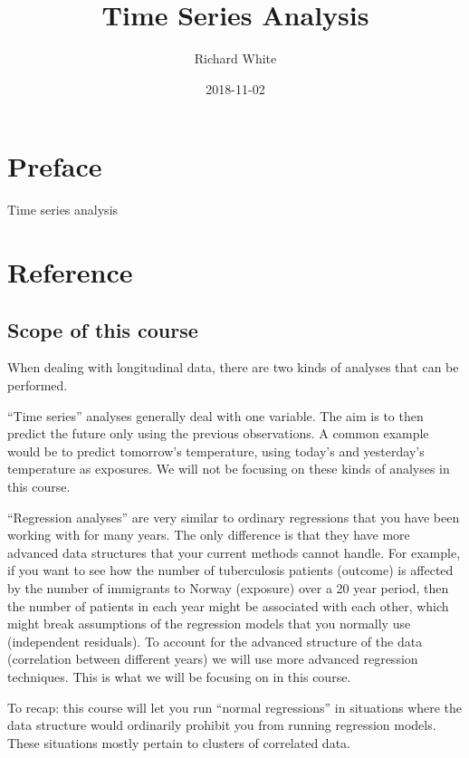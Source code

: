 \documentclass[]{book}
\title{Time Series Analysis}
\author{Richard White}
\date{2018-11-02}
\begin{document}
\maketitle

{
\setcounter{tocdepth}{1}
\tableofcontents
}
\chapter*{Preface}\label{preface}

Time series analysis

\chapter{Reference}\label{reference}

\section{Scope of this course}\label{scope-of-this-course}

When dealing with longitudinal data, there are two kinds of analyses
that can be performed.

``Time series'' analyses generally deal with one variable. The aim is to
then predict the future only using the previous observations. A common
example would be to predict tomorrow's temperature, using today's and
yesterday's temperature as exposures. We will not be focusing on these
kinds of analyses in this course.

``Regression analyses'' are very similar to ordinary regressions that
you have been working with for many years. The only difference is that
they have more advanced data structures that your current methods cannot
handle. For example, if you want to see how the number of tuberculosis
patients (outcome) is affected by the number of immigrants to Norway
(exposure) over a 20 year period, then the number of patients in each
year might be associated with each other, which might break assumptions
of the regression models that you normally use (independent residuals).
To account for the advanced structure of the data (correlation between
different years) we will use more advanced regression techniques. This
is what we will be focusing on in this course.

To recap: this course will let you run ``normal regressions'' in
situations where the data structure would ordinarily prohibit you from
running regression models. These situations mostly pertain to clusters
of correlated data.
\end{document}
